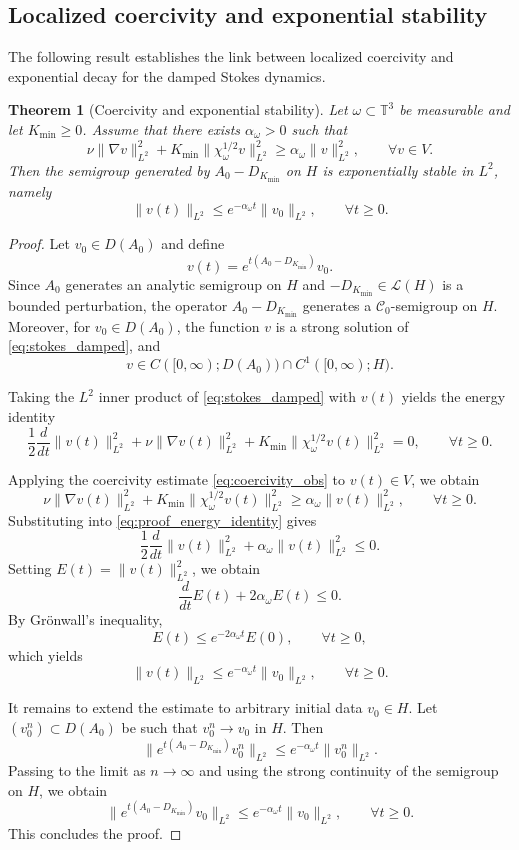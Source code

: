 \documentclass[preprint,12pt]{elsarticle}
\newtheorem{theorem} {Theorem}[section]
\begin{document}
\subsection{Localized coercivity and exponential stability}

The following result establishes the link between localized coercivity and
exponential decay for the damped Stokes dynamics.

\begin{theorem}[Coercivity and exponential stability]
\label{thm:observability_coercivity}
Let $\omega\subset\mathbb{T}^3$ be measurable and let $K_{\min}\ge 0$.
Assume that there exists $\alpha_\omega>0$ such that
\begin{equation}
\label{eq:coercivity_obs}
\nu\|\nabla v\|_{L^2}^2
+
K_{\min}\|\chi_\omega^{1/2}v\|_{L^2}^2
\ge
\alpha_\omega\|v\|_{L^2}^2,
\qquad \forall v\in V.
\end{equation}
Then the semigroup generated by $A_0-D_{K_{\min}}$ on $H$ is exponentially
stable in $L^2$, namely
\[
\|v(t)\|_{L^2}\le e^{-\alpha_\omega t}\|v_0\|_{L^2},
\qquad \forall t\ge0.
\]
\end{theorem}

\begin{proof}
Let $v_0\in D(A_0)$ and define
\[
v(t)=e^{t(A_0-D_{K_{\min}})}v_0.
\]
Since $A_0$ generates an analytic semigroup on $H$ and
$-D_{K_{\min}}\in\mathcal L(H)$ is a bounded perturbation, the operator
$A_0-D_{K_{\min}}$ generates a $\mathcal C_0$-semigroup on $H$.
Moreover, for $v_0\in D(A_0)$, the function $v$ is a strong solution of
\eqref{eq:stokes_damped}, and
\[
v\in C([0,\infty);D(A_0))\cap C^1([0,\infty);H).
\]

Taking the $L^2$ inner product of \eqref{eq:stokes_damped} with $v(t)$ yields
the energy identity
\begin{equation}
\label{eq:proof_energy_identity}
\frac12\frac{d}{dt}\|v(t)\|_{L^2}^2
+
\nu\|\nabla v(t)\|_{L^2}^2
+
K_{\min}\|\chi_\omega^{1/2}v(t)\|_{L^2}^2
=0,
\qquad \forall t\ge0.
\end{equation}

Applying the coercivity estimate \eqref{eq:coercivity_obs} to $v(t)\in V$, we obtain
\[
\nu\|\nabla v(t)\|_{L^2}^2
+
K_{\min}\|\chi_\omega^{1/2}v(t)\|_{L^2}^2
\ge
\alpha_\omega\|v(t)\|_{L^2}^2,
\qquad \forall t\ge0.
\]
Substituting into \eqref{eq:proof_energy_identity} gives
\[
\frac12\frac{d}{dt}\|v(t)\|_{L^2}^2
+
\alpha_\omega\|v(t)\|_{L^2}^2
\le 0.
\]
Setting $E(t)=\|v(t)\|_{L^2}^2$, we obtain
\[
\frac{d}{dt}E(t)+2\alpha_\omega E(t)\le0.
\]
By Gr\"onwall's inequality,
\[
E(t)\le e^{-2\alpha_\omega t}E(0),
\qquad \forall t\ge0,
\]
which yields
\[
\|v(t)\|_{L^2}
\le
e^{-\alpha_\omega t}\|v_0\|_{L^2},
\qquad \forall t\ge0.
\]

It remains to extend the estimate to arbitrary initial data $v_0\in H$.
Let $(v_0^n)\subset D(A_0)$ be such that $v_0^n\to v_0$ in $H$.
Then
\[
\|e^{t(A_0-D_{K_{\min}})}v_0^n\|_{L^2}
\le
e^{-\alpha_\omega t}\|v_0^n\|_{L^2}.
\]
Passing to the limit as $n\to\infty$ and using the strong continuity of the
semigroup on $H$, we obtain
\[
\|e^{t(A_0-D_{K_{\min}})}v_0\|_{L^2}
\le
e^{-\alpha_\omega t}\|v_0\|_{L^2},
\qquad \forall t\ge0.
\]
This concludes the proof.
\end{proof}
\end{document}
